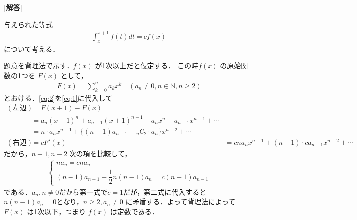 \documentclass[../../main.tex]{subfiles}
\begin{document}
\begin{oframed}
  
\end{oframed}

{\bf [解答]}

与えられた等式
\begin{align}
  \int_x^{x+1}f(t)dt=cf(x) \label{eq:1}
\end{align}
について考える．

題意を背理法で示す．$f(x)$ が1次以上だと仮定する．
この時$f(x)$ の原始関数の1つを $F(x)$ として，
\begin{align}
  F(x) = \sum_{k=0}^n a_k x^k \quad (a_n \neq 0, n \in \mathbb{N}, n \ge 2) \label{eq:2}
\end{align}
とおける．\cref{eq:2}を\cref{eq:1}に代入して
\begin{align}
  (\text{左辺})
  &= F(x+1)-F(x) \\
  &= a_n(x+1)^n + a_{n-1}(x+1)^{n-1} - a_n x^n - a_{n-1} x^{n-1} + \cdots \\
  &= n \cdot a_n x^{n-1} + \{ (n-1)a_{n-1} + {}_nC_2 \cdot a_n \} x^{n-2} + \cdots \\
  (\text{右辺})
  & = c F'(x) &= c n a_n x^{n-1} + (n-1) \cdot c a_{n-1} x^{n-2} + \cdots
\end{align}
だから，$n-1, n-2$ 次の項を比較して，
\begin{align}
  \begin{cases}
    n a_n = c n a_n  \\
    (n-1)a_{n-1} + \dfrac{1}{2}n(n-1)a_n = c(n-1)a_{n-1}
  \end{cases} \label{eq:3}
\end{align}
である．$a_n, n \neq 0$だから第一式で$c=1$だが，第二式に代入すると$n(n-1)a_n = 0$となり，$n \ge 2, a_n \neq 0$ に矛盾する．よって背理法によって $F(x)$ は1次以下，つまり $f(x)$ は定数である．
\end{document}
